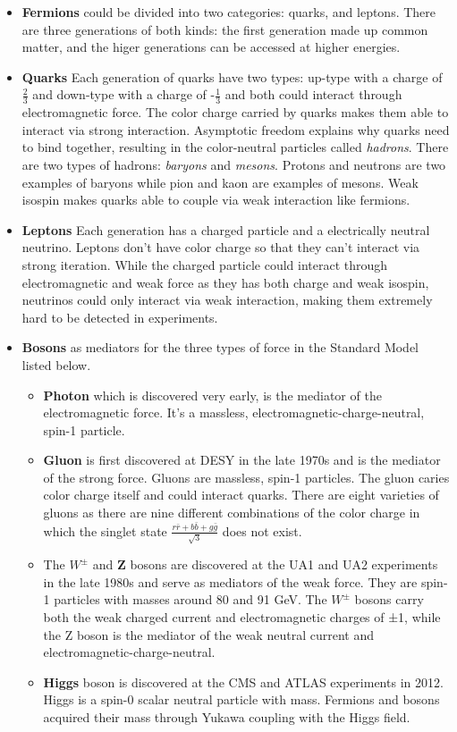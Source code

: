 \begin{itemize}
  \item \textbf{Fermions} could be divided into two categories: quarks, and leptons. There are three generations of both kinds: the first generation made up common matter, and the higer generations can be accessed at higher energies.
  \item \textbf{Quarks} Each generation of quarks have two types: up-type with a charge of $\frac{2}{3}$ and down-type with a charge of -$\frac{1}{3}$ and both could interact through electromagnetic force. The color charge carried by quarks makes them able to 
interact via strong interaction. Asymptotic freedom explains why quarks need to bind together, resulting in the color-neutral particles called \textit{hadrons}. There are two types of hadrons: \textit{baryons} and \textit{mesons}. Protons and neutrons are two examples of baryons while pion and kaon are examples of mesons. Weak isospin makes quarks able to couple via weak interaction like fermions.
  \item \textbf{Leptons} Each generation has a charged particle and a electrically neutral neutrino. Leptons don't have color charge so that they can't interact via strong iteration. While the charged particle could interact through electromagnetic and weak force as they has both charge and weak isospin, neutrinos could only interact via weak interaction, making them extremely hard to be detected in experiments.
  \item \textbf{Bosons} as mediators for the three types of force in the Standard Model listed below.
\begin{itemize}
  \item \textbf{Photon} which is discovered very early, is the mediator of the electromagnetic force. It's a massless, electromagnetic-charge-neutral, spin-1 particle.
  \item \textbf{Gluon} is first discovered at DESY in the late 1970s and is the mediator of the strong force. Gluons are massless, spin-1 particles. The gluon caries color charge itself and could interact quarks. There are eight varieties of gluons as there are nine different combinations of the color charge in which the singlet state $\frac{r\bar{r}+b\bar{b}+g\bar{g}}{\sqrt{3}}$ does not exist.

  \item The \textbf{$W^{\pm}$} and \textbf{Z} bosons are discovered at the UA1 and UA2 experiments in the late 1980s and serve as mediators of the weak force. They are spin-1 particles with masses around 80 and 91 GeV. The \textbf{$W^{\pm}$} bosons carry both the weak charged current and electromagnetic charges of ±1, while the Z boson is the mediator of the weak neutral current and electromagnetic-charge-neutral. 
    \item \textbf{Higgs} boson is discovered at the CMS and ATLAS experiments in 2012. Higgs is a spin-0 scalar neutral particle with mass. Fermions and bosons acquired their mass through Yukawa coupling with the Higgs field. 
\end{itemize}
\end{itemize}
 
